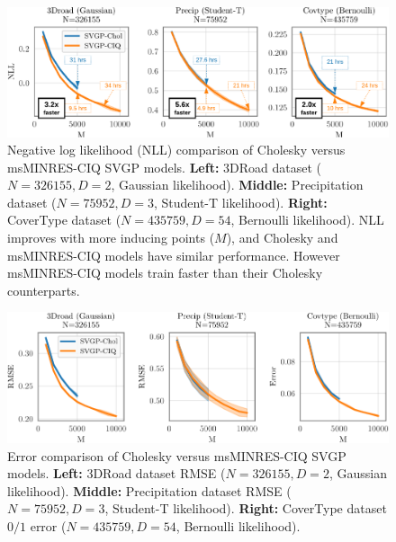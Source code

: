 \begin{figure}[t!]
  \centering
  \includegraphics[width=\linewidth]{figures/variational_nll.pdf}
  \caption[Negative log likelihood (NLL) comparison of Cholesky versus msMINRES-CIQ SVGP models.]{
    Negative log likelihood (NLL) comparison of Cholesky versus msMINRES-CIQ SVGP models.
    {\bf Left:} 3DRoad dataset ($N=326155, D=2$, Gaussian likelihood).
    {\bf Middle:} Precipitation dataset ($N=75952, D=3$, Student-T likelihood).
    {\bf Right:} CoverType dataset ($N=435759, D=54$, Bernoulli likelihood).
    NLL improves with more inducing points ($M$), and Cholesky and msMINRES-CIQ models have similar performance.
    However msMINRES-CIQ models train faster than their Cholesky counterparts.
  }
  \label{fig:variational_nll}
\end{figure}

\begin{figure}[t!]
  \centering
  \includegraphics[width=\linewidth]{figures/variational_error.pdf}
  \caption[Error comparison of Cholesky versus msMINRES-CIQ SVGP models.]{
    Error comparison of Cholesky versus msMINRES-CIQ SVGP models.
    {\bf Left:} 3DRoad dataset RMSE ($N=326155, D=2$, Gaussian likelihood).
    {\bf Middle:} Precipitation dataset RMSE ($N=75952, D=3$, Student-T likelihood).
    {\bf Right:} CoverType dataset $0/1$ error ($N=435759, D=54$, Bernoulli likelihood).
  }
  \label{fig:variational_error}
\end{figure}

